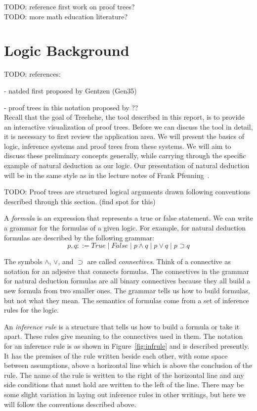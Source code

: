 \documentclass[conference]{IEEEtran}
\newcommand{\projectname}{Treehehe}
\begin{document}
TODO: reference first work on proof trees? \\

TODO: more math education literature? \\

\section{Logic Background}
\label{sec:background}

TODO: references:

- natded first proposed by Gentzen (Gen35)

- proof trees in this notation proposed by ?? \\

Recall that the goal of \projectname{}, the tool described in this report, is to provide an interactive visualization of proof trees. Before we can discuss the tool in detail, it is necessary to first review the application area. We will present the basics of logic, inference systems and proof trees from these systems. We will aim to discuss these preliminary concepts generally, while carrying through the specific example of natural deduction as our logic. Our presentation of natural deduction will be in the same style as in the lecture notes of Frank Pfenning~\cite{natded-pfenning}.

TODO: Proof trees are structured logical arguments drawn following conventions described through this section. (find spot for this)

A \textit{formula} is an expression that represents a true or false statement. We can write a grammar for the formulas of a given logic. For example, for natural deduction formulas are described by the following grammar:
$$
p, q ::= \mathit{True} \; | \; \mathit{False} \; | \; p \wedge q \; | \; p \vee q \; | \; p \supset q
$$

The symbols $\wedge$, $\vee$, and $\supset$ are called \textit{connectives}. Think of a connective as notation for an adjesive that connects formulas. The connectives in the grammar for natural deduction formulas are all binary connectives because they all build a new formula from two smaller ones. The grammar tells us how to build formulas, but not what they mean. The semantics of formulas come from a set of inference rules for the logic.

An \textit{inference rule} is a structure that tells us how to build a formula or take it apart. These rules give meaning to the connectives used in them. The notation for an inference rule is as shown in Figure~\ref{fig:infrule} and is described presently. It has the premises of the rule written beside each other, with some space between assumptions, above a horizontal line which is above the conclusion of the rule. The name of the rule is written to the right of the horizontal line and any side conditions that must hold are written to the left of the line. There may be some slight variation in laying out inference rules in other writings, but here we will follow the conventions described above.
\end{document}
